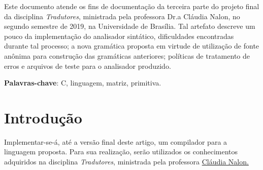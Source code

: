 \documentclass[
	article,			%
	11pt,				%
	oneside,			%
	a4paper,			%
	english,			%
	brazil,				%
	sumario=tradicional
	]{abntex2}
\begin{document}

\frenchspacing 


%
%

\maketitle





\begin{resumoumacoluna}
 Este documento atende os fins de documentação da terceira
 parte do projeto final da disciplina \textit{Tradutores},
 ministrada pela professora Dr.a Cláudia Nalon, no segundo semestre de 2019, na Universidade de Brasília. Tal artefato descreve um pouco da implementação do analisador sintático, dificuldades encontradas durante tal processo; a nova gramática proposta em virtude de utilização de fonte anônima para construção das gramáticas anteriores; políticas de tratamento de erros e arquivos de teste para o analisador produzido.
 \vspace{\onelineskip}
 
 \noindent
 \textbf{Palavras-chave}: C, linguagem, matriz, primitiva.
\end{resumoumacoluna}




\newcommand{\terminal}[1]{ \bnfpn{\textbf{#1}} }

\newcommand{\production}[1]{\bnfpn{\textit{#1}}}
\newcommand{\IT}[1]{\textit{#1}}
\newcommand{\BF}[1]{\textbf{#1}}


\section{Introdução}
Implementar-se-á, até a versão final deste artigo, um compilador para a linguagem proposta. Para sua realização, serão utilizados os conhecimentos adquiridos na disciplina \textit{Tradutores}, ministrada pela professora \hyperref{http://lattes.cnpq.br/7793795625581127}{}{}{Cláudia Nalon.}
\end{document}
